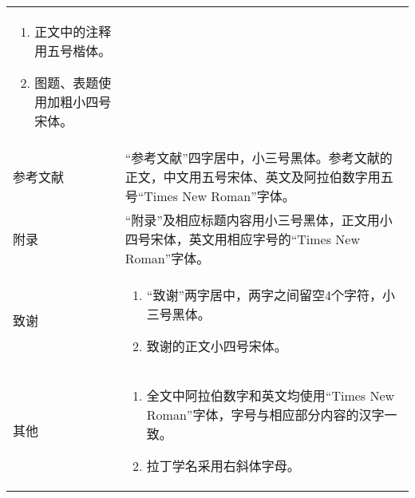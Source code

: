 \begin{center}
\begin{longtable}{m{4cm}m{10cm}}
\begin{enumerate}
      \item 正文中的注释用五号楷体。
      \item 图题、表题使用加粗小四号宋体。
    \end{enumerate}\\
    参考文献 & “参考文献”四字居中，小三号黑体。参考文献的正文，中文用五号宋体、英文及阿拉伯数字用五号“Times New Roman”字体。\\
    附录 & “附录”及相应标题内容用小三号黑体，正文用小四号宋体，英文用相应字号的“Times New Roman”字体。\\
    致谢 & 
    \begin{enumerate}
      \item “致谢”两字居中，两字之间留空4个字符，小三号黑体。        
      \item 致谢的正文小四号宋体。       
    \end{enumerate}\\
    其他 & 
    \begin{enumerate}
      \item 全文中阿拉伯数字和英文均使用“Times New Roman”字体，字号与相应部分内容的汉字一致。
      \item 拉丁学名采用右斜体字母。
    \end{enumerate}\\
  \end{longtable}
\end{center}